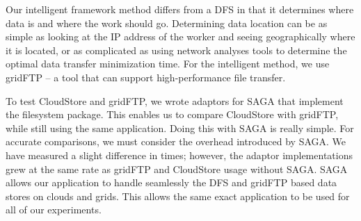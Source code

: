 \documentclass{rspublic}
\begin{document}
Our intelligent framework method differs from a DFS in that it
determines where data is and where the work should go. Determining
data location can be as simple as looking at the IP address of the
worker and seeing geographically where it is located, or as
complicated as using network analyses tools to determine the optimal
data transfer minimization time. For the intelligent method, we use
gridFTP -- a tool that can support high-performance file transfer.

To test CloudStore and gridFTP, we wrote adaptors for SAGA that
implement the filesystem package. This enables us to compare CloudStore
with gridFTP, while still using the same application. Doing this with
SAGA is really simple. For accurate comparisons, we must consider the
overhead introduced by SAGA. We have measured a slight difference in
times; however, the adaptor implementations grew at the same rate as
gridFTP and CloudStore usage without SAGA.  SAGA allows our application
to handle seamlessly the DFS and gridFTP based data stores on clouds and
grids.  This allows the same exact application to be used for all of our
experiments.


\vspace{-0.3cm}
\end{document}
